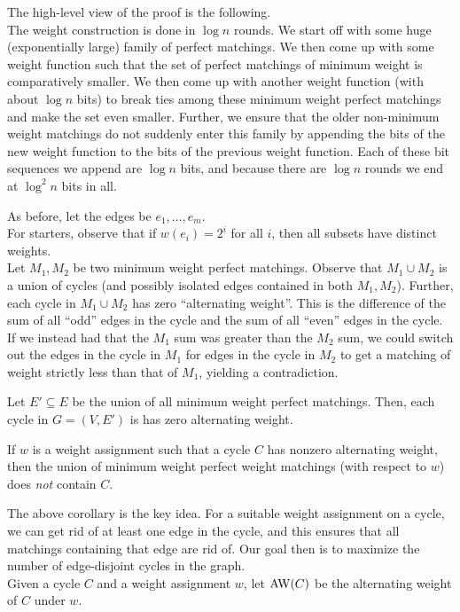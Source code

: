 			The high-level view of the proof is the following.\\
			The weight construction is done in $\log n$ rounds. We start off with some huge (exponentially large) family of perfect matchings. We then come up with some weight function such that the set of perfect matchings of minimum weight is comparatively smaller. We then come up with another weight function (with about $\log n$ bits) to break ties among these minimum weight perfect matchings and make the set even smaller. Further, we ensure that the older non-minimum weight matchings do not suddenly enter this family by appending the bits of the new weight function to the bits of the previous weight function. Each of these bit sequences we append are $\log n$ bits, and because there are $\log n$ rounds we end at $\log^2 n$ bits in all.

			As before, let the edges be $e_1,\ldots,e_m$.\\
			For starters, observe that if $w(e_i) = 2^i$ for all $i$, then all subsets have distinct weights.\\
			Let $M_1,M_2$ be two minimum weight perfect matchings. Observe that $M_1 \cup M_2$ is a union of cycles (and possibly isolated edges contained in both $M_1,M_2$). Further, each cycle in $M_1 \cup M_2$ has zero ``alternating weight''. This is the difference of the sum of all ``odd'' edges in the cycle and the sum of all ``even'' edges in the cycle. If we instead had that the $M_1$ sum was greater than the $M_2$ sum, we could switch out the edges in the cycle in $M_1$ for edges in the cycle in $M_2$ to get a matching of weight strictly less than that of $M_1$, yielding a contradiction.

			\begin{flem}
				\label{lem: union of perfect matchings}
				Let $E' \subseteq E$ be the union of all minimum weight perfect matchings. Then, each cycle in $G = (V,E')$ is has zero alternating weight.
			\end{flem}
			
			\begin{corollary}
				If $w$ is a weight assignment such that a cycle $C$ has nonzero alternating weight, then the union of minimum weight perfect weight matchings (with respect to $w$) does \emph{not} contain $C$.
			\end{corollary}

			The above corollary is the key idea. For a suitable weight assignment on a cycle, we can get rid of at least one edge in the cycle, and this ensures that all matchings containing that edge are rid of. Our goal then is to maximize the number of edge-disjoint cycles in the graph.\\
			Given a cycle $C$ and a weight assignment $w$, let $\operatorname{AW}(C)$ be the alternating weight of $C$ under $w$.

